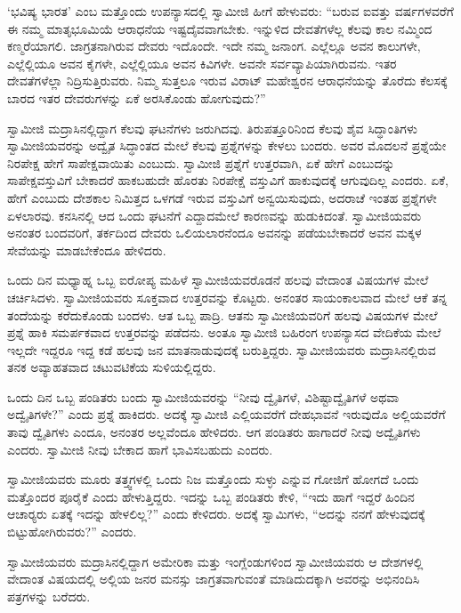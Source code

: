  ‘ಭವಿಷ್ಯ ಭಾರತ’ ಎಂಬ ಮತ್ತೊಂದು ಉಪನ್ಯಾಸದಲ್ಲಿ ಸ್ವಾಮೀಜಿ ಹೀಗೆ ಹೇಳುವರು: “ಬರುವ ಐವತ್ತು ವರ್ಷಗಳವರೆಗೆ ಈ ನಮ್ಮ ಮಾತೃಭೂಮಿಯೆ ಆರಾಧನೆಯ ಇಷ್ಟದೈವವಾಗಬೇಕು. ಇನ್ನುಳಿದ ದೇವತೆಗಳೆಲ್ಲ ಕೆಲವು ಕಾಲ ನಮ್ಮಿಂದ ಕಣ್ಮರೆಯಾಗಲಿ. ಜಾಗ್ರತನಾಗಿರುವ ದೇವರು ಇದೊಂದೇ. ಇದೇ ನಮ್ಮ ಜನಾಂಗ. ಎಲ್ಲೆಲ್ಲೂ ಅವನ ಕಾಲುಗಳೇ, ಎಲ್ಲೆಲ್ಲಿಯೂ ಅವನ ಕೈಗಳೇ, ಎಲ್ಲೆಲ್ಲಿಯೂ ಅವನ ಕಿವಿಗಳೇ. ಅವನೇ ಸರ್ವವ್ಯಾಪಿಯಾಗಿರುವನು. ಇತರ ದೇವತೆಗಳೆಲ್ಲಾ ನಿದ್ರಿಸುತ್ತಿರುವರು. ನಿಮ್ಮ ಸುತ್ತಲೂ ಇರುವ ವಿರಾಟ್ ಮಹೇಶ್ವರನ ಆರಾಧನೆಯನ್ನು ತೊರೆದು ಕೆಲಸಕ್ಕೆ ಬಾರದ ಇತರ ದೇವರುಗಳನ್ನು ಏಕೆ ಅರಸಿಕೊಂಡು ಹೋಗುವುದು?” 

 ಸ್ವಾಮೀಜಿ ಮದ್ರಾಸಿನಲ್ಲಿದ್ದಾಗ ಕೆಲವು ಘಟನೆಗಳು ಜರುಗಿದವು. ತಿರುಪತ್ತೂರಿನಿಂದ ಕೆಲವು ಶೈವ ಸಿದ್ಧಾಂತಿಗಳು ಸ್ವಾಮೀಜಿಯವರನ್ನು ಅದ್ವೈತ ಸಿದ್ಧಾಂತದ ಮೇಲೆ ಕೆಲವು ಪ್ರಶ್ನೆಗಳನ್ನು ಕೇಳಲು ಬಂದರು. ಅವರ ಮೊದಲನೆ ಪ್ರಶ್ನೆಯೇ ನಿರಪೇಕ್ಷ ಹೇಗೆ ಸಾಪೇಕ್ಷವಾಯಿತು ಎಂಬುದು. ಸ್ವಾಮೀಜಿ ಪ್ರಶ್ನೆಗೆ ಉತ್ತರವಾಗಿ, ಏಕೆ ಹೇಗೆ ಎಂಬುದನ್ನು ಸಾಪೇಕ್ಷವಸ್ತುವಿಗೆ ಬೇಕಾದರೆ ಹಾಕಬಹುದೇ ಹೊರತು ನಿರಪೇಕ್ಷೆ ವಸ್ತುವಿಗೆ ಹಾಕುವುದಕ್ಕೆ ಆಗುವುದಿಲ್ಲ ಎಂದರು. ಏಕೆ, ಹೇಗೆ ಎಂಬುದು ದೇಶಕಾಲ ನಿಮಿತ್ತದ ಒಳಗಡೆ ಇರುವ ವಸ್ತುವಿಗೆ ಅನ್ವಯಿಸುವುದು, ಅದರಾಚೆ ಇಂತಹ ಪ್ರಶ್ನೆಗಳೇ ಏಳಲಾರವು. ಕನಸಿನಲ್ಲಿ ಆದ ಒಂದು ಘಟನೆಗೆ ಎದ್ದಾದಮೇಲೆ ಕಾರಣವನ್ನು ಹುಡುಕಿದಂತೆ. ಸ್ವಾಮೀಜಿಯವರು ಅನಂತರ ಬಂದವರಿಗೆ, ತರ್ಕದಿಂದ ದೇವರು ಒಲಿಯಲಾರನೆಂದೂ ಅವನನ್ನು ಪಡೆಯಬೇಕಾದರೆ ಅವನ ಮಕ್ಕಳ ಸೇವೆಯನ್ನು ಮಾಡಬೇಕೆಂದೂ ಹೇಳಿದರು. 

 ಒಂದು ದಿನ ಮಧ್ಯಾಹ್ನ ಒಬ್ಬ ಐರೋಪ್ಯ ಮಹಿಳೆ ಸ್ವಾಮೀಜಿಯವರೊಡನೆ ಹಲವು ವೇದಾಂತ ವಿಷಯಗಳ ಮೇಲೆ ಚರ್ಚಿಸಿದಳು. ಸ್ವಾಮೀಜಿಯವರು ಸೂಕ್ತವಾದ ಉತ್ತರವನ್ನು ಕೊಟ್ಟರು. ಅನಂತರ ಸಾಯಂಕಾಲವಾದ ಮೇಲೆ ಆಕೆ ತನ್ನ ತಂದೆಯನ್ನು ಕರೆದುಕೊಂಡು ಬಂದಳು. ಆತ ಒಬ್ಬ ಪಾದ್ರಿ. ಆತನು ಸ್ವಾಮೀಜಿಯವರಿಗೆ ಹಲವು ವಿಷಯಗಳ ಮೇಲೆ ಪ್ರಶ್ನೆ ಹಾಕಿ ಸಮರ್ಪಕವಾದ ಉತ್ತರವನ್ನು ಪಡೆದನು. ಅಂತೂ ಸ್ವಾಮೀಜಿ ಬಹಿರಂಗ ಉಪನ್ಯಾಸದ ವೇದಿಕೆಯ ಮೇಲೆ ಇಲ್ಲದೇ ಇದ್ದರೂ ಇದ್ದ ಕಡೆ ಹಲವು ಜನ ಮಾತನಾಡುವುದಕ್ಕೆ ಬರುತ್ತಿದ್ದರು. ಸ್ವಾಮೀಜಿಯವರು ಮದ್ರಾಸಿನಲ್ಲಿರುವ ತನಕ ಅವ್ಯಾಹತವಾದ ಚಟುವಟಿಕೆಯ ಸುಳಿಯಲ್ಲಿದ್ದರು. 

 ಒಂದು ದಿನ ಒಬ್ಬ ಪಂಡಿತರು ಬಂದು ಸ್ವಾಮೀಜಿಯವರನ್ನು “ನೀವು ದ್ವೈತಿಗಳೆ, ವಿಶಿಷ್ಟಾದ್ವೈತಿಗಳೆ ಅಥವಾ ಅದ್ವೈತಿಗಳೇ?” ಎಂದು ಪ್ರಶ್ನೆ ಹಾಕಿದರು. ಅದಕ್ಕೆ ಸ್ವಾಮೀಜಿ ಎಲ್ಲಿಯವರೆಗೆ ದೇಹಭಾವನೆ ಇರುವುದೊ ಅಲ್ಲಿಯವರೆಗೆ ತಾವು ದ್ವೈತಿಗಳು ಎಂದೂ, ಅನಂತರ ಅಲ್ಲವೆಂದೂ ಹೇಳಿದರು. ಆಗ ಪಂಡಿತರು ಹಾಗಾದರೆ ನೀವು ಅದ್ವೈತಿಗಳು ಎಂದರು. ಸ್ವಾಮೀಜಿ ನೀವು ಬೇಕಾದ ಹಾಗೆ ಭಾವಿಸಬಹುದು ಎಂದರು. 

 ಸ್ವಾಮೀಜಿಯವರು ಮೂರು ತತ್ತ್ವಗಳಲ್ಲಿ ಒಂದು ನಿಜ ಮತ್ತೊಂದು ಸುಳ್ಳು ಎನ್ನುವ ಗೋಜಿಗೆ ಹೋಗದೆ ಒಂದು ಮತ್ತೊಂದರ ಪೂರೈಕೆ ಎಂದು ಹೇಳುತ್ತಿದ್ದರು. ಇದನ್ನು ಒಬ್ಬ ಪಂಡಿತರು ಕೇಳಿ, “ಇದು ಹಾಗೆ ಇದ್ದರೆ ಹಿಂದಿನ ಆಚಾರ‍್ಯರು ಏತಕ್ಕೆ ಇದನ್ನು ಹೇಳಲಿಲ್ಲ?” ಎಂದು ಕೇಳಿದರು. ಅದಕ್ಕೆ ಸ್ವಾಮಿಗಳು, “ಅದನ್ನು ನನಗೆ ಹೇಳುವುದಕ್ಕೆ ಬಿಟ್ಟುಹೋಗಿರುವರು?” ಎಂದರು. 

 ಸ್ವಾಮೀಜಿಯವರು ಮದ್ರಾಸಿನಲ್ಲಿದ್ದಾಗ ಅಮೇರಿಕಾ ಮತ್ತು ಇಂಗ್ಲೆಂಡುಗಳಿಂದ ಸ್ವಾಮೀಜಿಯವರು ಆ ದೇಶಗಳಲ್ಲಿ ವೇದಾಂತ ವಿಷಯದಲ್ಲಿ ಅಲ್ಲಿಯ ಜನರ ಮನಸ್ಸು ಜಾಗ್ರತವಾಗುವಂತೆ ಮಾಡಿದುದಕ್ಕಾಗಿ ಅವರನ್ನು ಅಭಿನಂದಿಸಿ ಪತ್ರಗಳನ್ನು ಬರೆದರು. 


